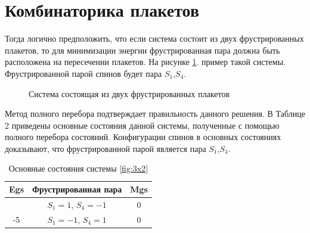 \documentclass[utf8, babel, sor, jor, amsmath, amssymb, reprint]{elsarticle} %
\begin{document}
\section{Комбинаторика плакетов}
  
Тогда логично предположить, что если система состоит из двух фрустрированных плакетов, то для минимизации энергии фрустрированная пара должна быть расположена на пересечении плакетов. На рисунке \ref{fig:3x2}. пример такой системы. Фрустрированной парой спинов будет пара $S_1$,$S_4$.

\begin{figure}[H]
	\centering
	\begin{minipage}{0.3\textwidth}
		\centering
		\caption{Система состоящая из двух фрустрированных плакетов}
		\label{fig:3x2}
	\end{minipage}
\end{figure}

Метод полного перебора подтверждает правильность данного решения. В Таблице 2 приведены основные состояния данной системы, полученные с помощью полного перебора состояний. Конфигурации спинов в основных состояниях доказывают, что фрустрированной парой является пара $S_1$,$S_4$. 

\begin{table}[H]
	\centering
	\begin{tabular}{|c|c|c|}
		\hline
		 Egs   &   Фрустрированная пара & Mgs\\
		 \hline
		  &  $S_1=1$, $S_4=-1$ & 0 \\
		  \cline{2-3}
		  	-5	\multirow{3}{*}{}
		   &   $S_1=-1$, $S_4=1$ & 0 \\
		\hline
	\end{tabular}
	\caption{Основные состояния системы \eqref{fig:3x2} }
	\label{tab:gs}
\end{table}
\end{document}

